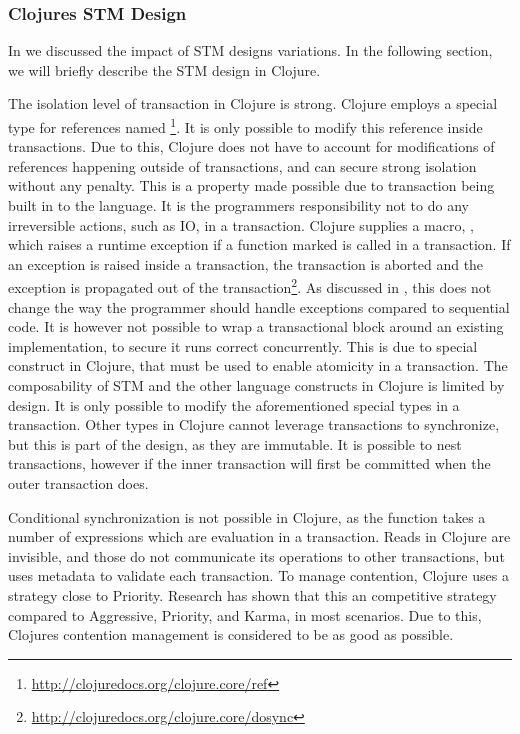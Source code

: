 \subsubsection{Clojures \acs{STM} Design}
In  we discussed the impact of \ac{STM} designs variations. In the following section, we will briefly describe the \ac{STM} design in Clojure.

The isolation level of transaction in Clojure is strong. Clojure employs a special type for references named \footnote{\url{http://clojuredocs.org/clojure.core/ref}}. It is only possible to modify this reference  inside transactions. Due to this, Clojure does not have to account for modifications of references happening outside of transactions, and can secure strong isolation without any penalty. This is a property made possible due to transaction being built in to the language. It is the programmers responsibility not to do any irreversible actions, such as \ac{IO}, in a transaction. Clojure supplies a macro, , which raises a runtime exception if a function marked is called in a transaction. If an exception is raised inside a transaction, the transaction is aborted and the exception is propagated out of the transaction\footnote{\url{http://clojuredocs.org/clojure.core/dosync}}. As discussed in , this does not change the way the programmer should handle exceptions compared to sequential code. It is however not possible to wrap a transactional block around an existing implementation, to secure it runs correct concurrently. This is due to special  construct in Clojure, that must be used to enable atomicity in a transaction. The composability of \ac{STM} and the other language constructs in Clojure is limited by design. It is only possible to modify the aforementioned special types in a transaction. Other types in Clojure cannot leverage transactions to synchronize, but this is part of the design, as they are immutable. It is possible to nest transactions, however if the inner transaction will first be committed when the outer transaction does.

Conditional synchronization is not possible in Clojure, as the  function takes a number of expressions which are evaluation in a transaction. Reads in Clojure are invisible\cite{nielsen2010benchmarking}, and those do not communicate its operations to other transactions, but uses metadata to validate each transaction. To manage contention, Clojure uses a strategy close to Priority\cite{nielsen2010benchmarking}. Research\cite{nielsen2010benchmarking} has shown that this an competitive strategy compared to Aggressive, Priority, and Karma, in most scenarios. Due to this, Clojures contention management is considered to be as good as possible.


